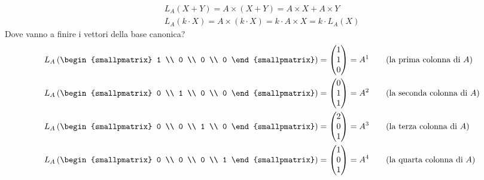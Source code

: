 \begin{align*}
L_A(X+Y) = A \times (X + Y) = A \times X + A \times Y \\
L_A(k \cdot X) = A \times (k \cdot X) = k \cdot A \times X = k \cdot L_A (X)
\end{align*}
Dove vanno a finire i vettori della base canonica?
\begin{align*}
L_A \left(
\begin{smallpmatrix}
1 \\ 0 \\ 0 \\ 0
\end{smallpmatrix}
\right) &= 
\begin{pmatrix}
1 \\ 1 \\ 0
\end{pmatrix} = A^1 \tag{la prima colonna di $A$} \\
L_A \left(
\begin{smallpmatrix}
0 \\ 1 \\ 0 \\ 0
\end{smallpmatrix}
\right) &= 
\begin{pmatrix}
0 \\ 1 \\ 1
\end{pmatrix} = A^2 \tag{la seconda colonna di $A$} \\
L_A \left(
\begin{smallpmatrix}
0 \\ 0 \\ 1 \\ 0
\end{smallpmatrix}
\right) &= 
\begin{pmatrix}
2 \\ 0 \\ 1
\end{pmatrix} = A^3 \tag{la terza colonna di $A$} \\
L_A \left(
\begin{smallpmatrix}
0 \\ 0 \\ 0 \\ 1
\end{smallpmatrix}
\right) &= 
\begin{pmatrix}
1 \\ 0 \\ 1
\end{pmatrix} = A^4 \tag{la quarta colonna di $A$}
\end{align*}
